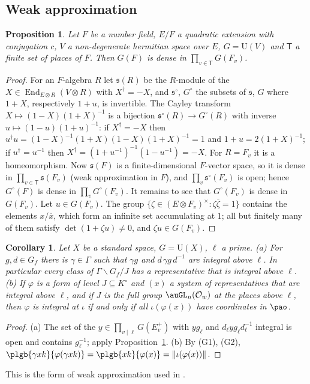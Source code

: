 \documentclass[10pt]{amsart}
\newtheorem{proposition}[theorem]{Proposition}
\newtheorem{corollary}[theorem]{Corollary}
\theoremstyle{definition}
\theoremstyle{remark}
\providecommand{\auO}{\mathcal O}
\providecommand{\auU}{\mathrm U}
\providecommand{\aubar}[1]{\overline{#1}}
\begin{document}
\subsection{Weak approximation}\label{pl:ss-wa}
\begin{proposition}\label{pl:wa}
Let $F$ be a number field, $E/F$ a quadratic extension with conjugation $c$, $V$ a non-degenerate
hermitian space over $E$, $G=\auU(V)$ and $\mathsf T$ a finite set of places of $F$. Then $G(F)$ is
dense in $\prod_{v\in\mathsf T}G(F_v)$.
\end{proposition}
\begin{proof}
For an $F$-algebra $R$ let $\mathfrak s(R)$ be the $R$-module of the $X\in\operatorname{End}_{E
\otimes R}(V\otimes R)$ with $X^\dagger=-X$, and $\mathfrak s^\circ$, $G^\circ$ the subsets of
$\mathfrak s$, $G$ where $1+X$, respectively $1+u$, is invertible. The Cayley transform
$X\mapsto(1-X)(1+X)^{-1}$ is a bijection $\mathfrak s^\circ(R)\to G^\circ(R)$ with inverse
$u\mapsto(1-u)(1+u)^{-1}$: if $X^\dagger=-X$ then $u^\dagger u=(1-X)^{-1}(1+X)(1-X)(1+X)^{-1}=1$
and $1+u=2(1+X)^{-1}$; if $u^\dagger=u^{-1}$ then $X^\dagger=(1+u^{-1})^{-1}(1-u^{-1})=-X$. For
$R=F_v$ it is a homeomorphism. Now $\mathfrak s(F)$ is a finite-dimensional $F$-vector space, so it
is dense in $\prod_{v\in\mathsf T}\mathfrak s(F_v)$ (weak approximation in $F$), and
$\prod_v\mathfrak s^\circ(F_v)$ is open; hence $G^\circ(F)$ is dense in $\prod_vG^\circ(F_v)$. It
remains to see that $G^\circ(F_v)$ is dense in $G(F_v)$. Let $u\in G(F_v)$. The group $\{\zeta\in
(E\otimes F_v)^\times:\zeta\aubar\zeta=1\}$ contains the elements $x/\aubar x$, which form an
infinite set accumulating at $1$; all but finitely many of them satisfy $\det(1+\zeta u)\ne0$, and
$\zeta u\in G(F_v)$.
\end{proof}

\begin{corollary}\label{pl:wacor}
Let $X$ be a standard space, $G=\auU(X)$, $\ell$ a prime.
{\rm(a)} For $g,d\in G_f$ there is $\gamma\in\Gamma$ such that $\gamma g$ and $d\,\gamma g\,d^{-1}$
are integral above $\ell$. In particular every class of $\Gamma\backslash G_f/J$ has a
representative that is integral above $\ell$.
{\rm(b)} If $\varphi$ is a form of level $J\subseteq K^\circ$ and $(x)$ a system of representatives
that are integral above $\ell$, and if $J$ is the full group $\auGL_n(\auO_w)$ at the places above
$\ell$, then $\varphi$ is integral at $\iota$ if and only if all $\iota(\varphi(x))$ have
coordinates in $\pao$.
\end{corollary}
\begin{proof}
(a) The set of the $y\in\prod_{v\mid\ell}G(E^+_v)$ with $yg_\ell$ and $d_\ell yg_\ell d_\ell^{-1}$
integral is open and contains $g_\ell^{-1}$; apply Proposition~\ref{pl:wa}. (b) By (G1), (G2),
$\plgb{\gamma xk}{\varphi(\gamma xk)}=\plgb{xk}{\varphi(x)}=\|\iota(\varphi(x))\|$.
\end{proof}
This is the form of weak approximation used in {\cite[\S2.7]{P50}}.
\end{document}

